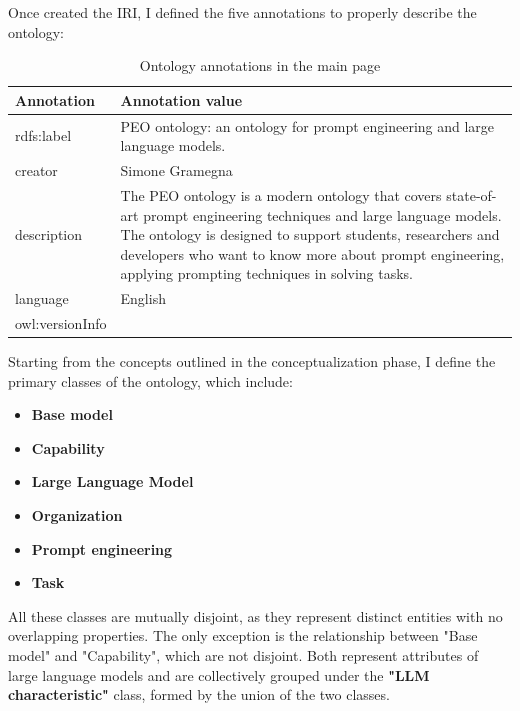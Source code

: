 Once created the IRI, I defined the five annotations to properly describe the ontology:
\begin{table}[H]
    \centering
    \begin{tabular}{|>{\raggedright\arraybackslash}p{6cm}|>{\raggedright\arraybackslash}p{6cm}|}
        \hline
        \textbf{Annotation} & \textbf{Annotation value} \\ \hline
         rdfs:label & PEO ontology: an ontology for prompt 
         engineering and large language models. \\ \hline
         
         creator & Simone Gramegna\\ \hline
         
         description & The PEO ontology is a modern ontology that covers state-of-art prompt engineering techniques and large language models. The ontology is designed to support students, researchers and developers who want to know more about prompt engineering, applying prompting techniques in solving tasks. \\ \hline
         
         language & English \\ \hline
         
         owl:versionInfo & 1.0 \\ \hline
    \end{tabular}
    \caption{Ontology annotations in the main page}
\end{table}
Starting from the concepts outlined in the conceptualization phase, I define the primary classes of the ontology, which include:
\begin{itemize}
    \item \textbf{Base model}

    \item \textbf{Capability}

    \item \textbf{Large Language Model}

    \item \textbf{Organization}

    \item \textbf{Prompt engineering}

    \item \textbf{Task}
\end{itemize}
All these classes are mutually disjoint, as they represent distinct entities with no overlapping properties. The only exception is the relationship between "Base model" and "Capability", which are not disjoint. Both represent attributes of large language models and are collectively grouped under the \textbf{"LLM characteristic"} class, formed by the union of the two classes. \\
